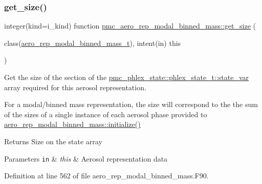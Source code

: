 \subsubsection{\texorpdfstring{get\+\_\+size()}{get\_size()}}
{\footnotesize\ttfamily integer(kind=i\+\_\+kind) function \mbox{\hyperlink{interfacepmc__aero__rep__data_1_1get__size}{pmc\+\_\+aero\+\_\+rep\+\_\+modal\+\_\+binned\+\_\+mass\+::get\+\_\+size}} (\begin{DoxyParamCaption}\item[{class(\mbox{\hyperlink{structpmc__aero__rep__modal__binned__mass_1_1aero__rep__modal__binned__mass__t}{aero\+\_\+rep\+\_\+modal\+\_\+binned\+\_\+mass\+\_\+t}}), intent(in)}]{this }\end{DoxyParamCaption})\hspace{0.3cm}{\ttfamily [private]}}



Get the size of the section of the {\ttfamily \mbox{\hyperlink{structpmc__phlex__state_1_1phlex__state__t_a78835cb552d483ebbfc7a6bc6f756918}{pmc\+\_\+phlex\+\_\+state\+::phlex\+\_\+state\+\_\+t\+::state\+\_\+var}}} array required for this aerosol representation. 

For a modal/binned mass representation, the size will correspond to the the sum of the sizes of a single instance of each aerosol phase provided to {\ttfamily \mbox{\hyperlink{namespacepmc__aero__rep__modal__binned__mass_ab5b93faae1796c83780773a5475adeed}{aero\+\_\+rep\+\_\+modal\+\_\+binned\+\_\+mass\+::initialize()}}} 

\begin{DoxyReturn}{Returns}
Size on the state array
\end{DoxyReturn}

\begin{DoxyParams}[1]{Parameters}
\mbox{\tt in}  & {\em this} & Aerosol representation data \\
\hline
\end{DoxyParams}


Definition at line 562 of file aero\+\_\+rep\+\_\+modal\+\_\+binned\+\_\+mass.\+F90.

\mbox{\label{namespacepmc__aero__rep__modal__binned__mass_ab5b93faae1796c83780773a5475adeed}} 
